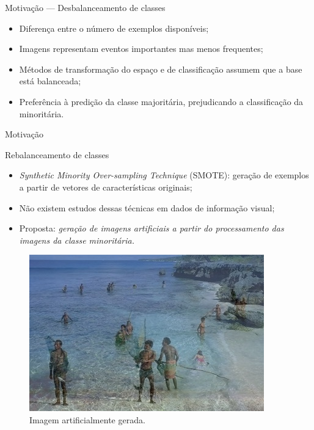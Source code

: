 \documentclass[10pt]{beamer}
\begin{document}
\begin{frame}{Motivação --- Desbalanceamento de classes}
  \setlength\leftmargini{1em}
  \begin{itemize}
    \item Diferença entre o número de exemplos disponíveis;
    \item Imagens representam eventos importantes mas menos frequentes;
    \item Métodos de transformação do espaço e de
    classificação assumem que a base está balanceada;
    \item Preferência à predição da classe majoritária, prejudicando a classificação da minoritária.
  \end{itemize}
\end{frame}
\begin{frame}{Motivação}
  \setlength\leftmargini{1em}
    \begin{block}{Rebalanceamento de classes}
    \begin{itemize}
      \item \textit{Synthetic Minority Over-sampling Technique} (SMOTE): geração de exemplos a partir de vetores de características originais;
      \item Não existem estudos dessas técnicas em dados de informação visual;
      \item Proposta: \textit{geração de imagens artificiais a partir do processamento das imagens da classe minoritária.}
    \end{itemize}
    \begin{figure}[htbp]
      \begin{center}
        \includegraphics[width=.25\linewidth]{figuras/imagemgerada.jpg}
      \end{center}
      \caption{Imagem artificialmente gerada.}
    \end{figure}
  \end{block}
\end{frame}
\end{document}
